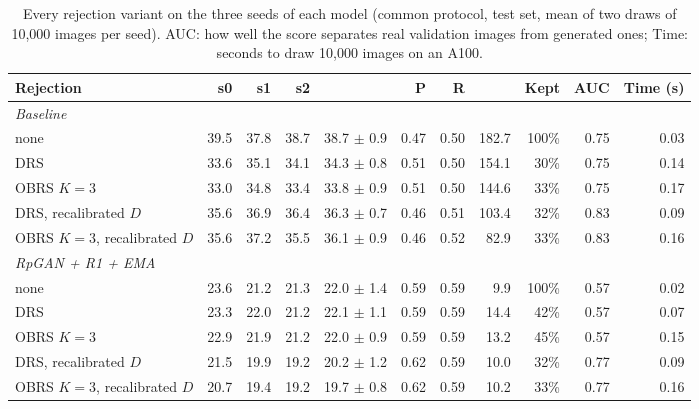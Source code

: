 \begin{table}[H]
\centering
\footnotesize
\setlength{\tabcolsep}{4pt}
\begin{tabular}{lrrrrrrrrrr}
\toprule
Rejection & s0 & s1 & s2 & \finc{} & P & R & \fcnn{} & Kept & AUC & Time (s) \\
\midrule
\multicolumn{10}{l}{\textit{Baseline}} \\
none & 39.5 & 37.8 & 38.7 & 38.7 $\pm$ 0.9 & 0.47 & 0.50 & 182.7 & 100\% & 0.75 & 0.03 \\
DRS & 33.6 & 35.1 & 34.1 & 34.3 $\pm$ 0.8 & 0.51 & 0.50 & 154.1 & 30\% & 0.75 & 0.14 \\
OBRS $K=3$ & 33.0 & 34.8 & 33.4 & 33.8 $\pm$ 0.9 & 0.51 & 0.50 & 144.6 & 33\% & 0.75 & 0.17 \\
DRS, recalibrated $D$ & 35.6 & 36.9 & 36.4 & 36.3 $\pm$ 0.7 & 0.46 & 0.51 & 103.4 & 32\% & 0.83 & 0.09 \\
OBRS $K=3$, recalibrated $D$ & 35.6 & 37.2 & 35.5 & 36.1 $\pm$ 0.9 & 0.46 & 0.52 & 82.9 & 33\% & 0.83 & 0.16 \\
\multicolumn{10}{l}{\textit{RpGAN + R1 + EMA}} \\
none & 23.6 & 21.2 & 21.3 & 22.0 $\pm$ 1.4 & 0.59 & 0.59 & 9.9 & 100\% & 0.57 & 0.02 \\
DRS & 23.3 & 22.0 & 21.2 & 22.1 $\pm$ 1.1 & 0.59 & 0.59 & 14.4 & 42\% & 0.57 & 0.07 \\
OBRS $K=3$ & 22.9 & 21.9 & 21.2 & 22.0 $\pm$ 0.9 & 0.59 & 0.59 & 13.2 & 45\% & 0.57 & 0.15 \\
DRS, recalibrated $D$ & 21.5 & 19.9 & 19.2 & 20.2 $\pm$ 1.2 & 0.62 & 0.59 & 10.0 & 32\% & 0.77 & 0.09 \\
OBRS $K=3$, recalibrated $D$ & 20.7 & 19.4 & 19.2 & 19.7 $\pm$ 0.8 & 0.62 & 0.59 & 10.2 & 33\% & 0.77 & 0.16 \\
\bottomrule
\end{tabular}
\caption{Every rejection variant on the three seeds of each model (common protocol, test set, mean of two draws of 10,000 images per seed). AUC: how well the score separates real validation images from generated ones; Time: seconds to draw 10,000 images on an A100.}
\label{tab:supp-rejection}
\end{table}
